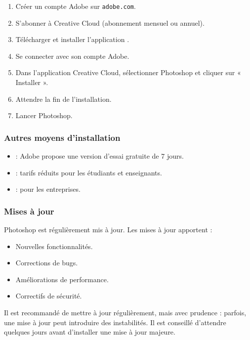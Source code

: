 \begin{enumerate}
    \item Créer un compte Adobe sur \texttt{adobe.com}.
    \item S'abonner à Creative Cloud (abonnement mensuel ou annuel).
    \item Télécharger et installer l'application .
    \item Se connecter avec son compte Adobe.
    \item Dans l'application Creative Cloud, sélectionner Photoshop et cliquer sur « Installer ».
    \item Attendre la fin de l'installation.
    \item Lancer Photoshop.
\end{enumerate}

\subsubsection{Autres moyens d'installation}

\begin{itemize}
    \item {} : Adobe propose une version d'essai gratuite de 7 jours.
    \item {} : tarifs réduits pour les étudiants et enseignants.
    \item {} : pour les entreprises.
\end{itemize}

\subsubsection{Mises à jour}

Photoshop est régulièrement mis à jour. Les mises à jour apportent :

\begin{itemize}
    \item Nouvelles fonctionnalités.
    \item Corrections de bugs.
    \item Améliorations de performance.
    \item Correctifs de sécurité.
\end{itemize}

Il est recommandé de mettre à jour régulièrement, mais avec prudence : parfois, une mise à jour peut introduire des instabilités. Il est conseillé d'attendre quelques jours avant d'installer une mise à jour majeure.

